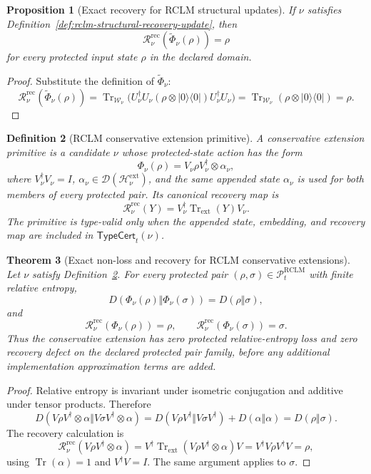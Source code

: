 \documentclass[11pt,a4paper]{article}
\newtheorem{theorem}{Theorem}[section]
\newtheorem{proposition}[theorem]{Proposition}
\newtheorem{definition}[theorem]{Definition}
\newcommand{\D}{\mathcal D}
\newcommand{\Hcal}{\mathcal H}
\newcommand{\Pcal}{\mathcal P}
\newcommand{\Tr}{\operatorname{Tr}}
\newcommand{\RCLM}{\mathrm{RCLM}}
\newcommand{\rec}{\mathrm{rec}}
\begin{document}
\begin{proposition}[Exact recovery for RCLM structural updates]
\label{prop:rclm-structural-exact-recovery}
If \(\nu\) satisfies Definition~\ref{def:rclm-structural-recovery-update}, then
\[
\mathcal R^{\rec}_{\nu}(\widetilde\Phi_\nu(\rho))=\rho
\]
for every protected input state \(\rho\) in the declared domain.
\end{proposition}

\begin{proof}
Substitute the definition of \(\widetilde\Phi_\nu\):
\[
\mathcal R^{\rec}_{\nu}(\widetilde\Phi_\nu(\rho))
=
\Tr_{\mathcal W_\nu}\!\bigl(U_\nu^\dagger U_\nu(\rho\otimes |0\rangle\langle0|)U_\nu^\dagger U_\nu\bigr)
=
\Tr_{\mathcal W_\nu}(\rho\otimes |0\rangle\langle0|)=\rho.
\]
\end{proof}

\begin{definition}[RCLM conservative extension primitive]
\label{def:rclm-conservative-extension-primitive}
A conservative extension primitive is a candidate \(\nu\) whose protected-state action has the form
\[
\Phi_\nu(\rho)=V_\nu\rho V_\nu^\dagger\otimes\alpha_\nu,
\]
where \(V_\nu^\dagger V_\nu=I\), \(\alpha_\nu\in\D(\Hcal_{\nu}^{\mathrm{ext}})\), and the same appended state \(\alpha_\nu\) is used for both members of every protected pair.  Its canonical recovery map is
\[
\mathcal R_\nu^{\rec}(Y)=V_\nu^\dagger\Tr_{\mathrm{ext}}(Y)V_\nu.
\]
The primitive is type-valid only when the appended state, embedding, and recovery map are included in \(\mathsf{TypeCert}_t(\nu)\).
\end{definition}

\begin{theorem}[Exact non-loss and recovery for RCLM conservative extensions]
\label{thm:rclm-conservative-extension-nonloss}
Let \(\nu\) satisfy Definition~\ref{def:rclm-conservative-extension-primitive}.  For every protected pair \((\rho,\sigma)\in\Pcal_t^{\RCLM}\) with finite relative entropy,
\[
D(\Phi_\nu(\rho)\Vert\Phi_\nu(\sigma))=D(\rho\Vert\sigma),
\]
and
\[
\mathcal R_\nu^{\rec}(\Phi_\nu(\rho))=\rho,
\qquad
\mathcal R_\nu^{\rec}(\Phi_\nu(\sigma))=\sigma.
\]
Thus the conservative extension has zero protected relative-entropy loss and zero recovery defect on the declared protected pair family, before any additional implementation approximation terms are added.
\end{theorem}

\begin{proof}
Relative entropy is invariant under isometric conjugation and additive under tensor products.  Therefore
\[
D(V\rho V^\dagger\otimes\alpha\Vert V\sigma V^\dagger\otimes\alpha)
= D(V\rho V^\dagger\Vert V\sigma V^\dagger)+D(\alpha\Vert\alpha)
= D(\rho\Vert\sigma).
\]
The recovery calculation is
\[
\mathcal R_\nu^{\rec}(V\rho V^\dagger\otimes\alpha)
=V^\dagger\Tr_{\mathrm{ext}}(V\rho V^\dagger\otimes\alpha)V
=V^\dagger V\rho V^\dagger V
=\rho,
\]
using \(\Tr(\alpha)=1\) and \(V^\dagger V=I\).  The same argument applies to \(\sigma\).
\end{proof}
\end{document}
